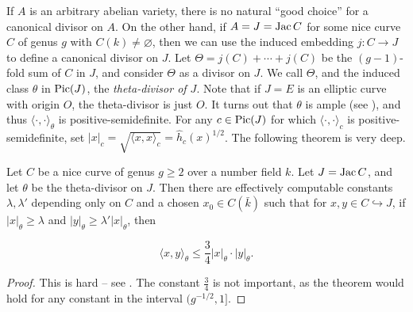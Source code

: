 If $A$ is an arbitrary abelian variety, there is no natural ``good choice'' for 
a canonical divisor on $A$. On the other hand, if $A=J=\operatorname{Jac} C$ for some nice 
curve $C$ of genus $g$ with $C(k)\ne\varnothing$, then we can use the induced 
embedding $j:C\to J$ to define a canonical divisor on $J$. Let 
$\Theta=j(C)+\cdots + j(C)$ be the $(g-1)$-fold sum of $C$ in $J$, and consider 
$\Theta$ as a divisor on $J$. We call $\Theta$, and the induced class $\theta$ 
in $\operatorname{Pic}(J)$, the \emph{theta-divisor of $J$}. Note that if $J=E$ is an elliptic 
curve with origin $O$, the theta-divisor is just $O$.  It turns out that 
$\theta$ is ample (see \cite[8.10.22]{bg06}), and thus 
$\langle\cdot,\cdot\rangle_\theta$ is positive-semidefinite. For any 
$c\in \operatorname{Pic}(J)$ for which $\langle\cdot,\cdot\rangle_c$ is 
positive-semidefinite, set 
$|x|_c=\sqrt{\langle x,x\rangle_c} = \widehat h_c(x)^{1/2}$. The following 
theorem is very deep.

\begin{theorem}
Let $C$ be a nice curve of genus $g\geqslant 2$ over a number field $k$. Let 
$J=\operatorname{Jac} C$, and let $\theta$ be the theta-divisor on $J$. Then there are 
effectively computable constants $\lambda,\lambda'$ depending only on $C$ and 
a chosen $x_0\in C(\bar k)$ such that for $x,y\in C\hookrightarrow J$, if 
$|x|_\theta\geqslant \lambda$ and 
$|y|_\theta\geqslant \lambda'|x|_\theta$, then 

\[
  \langle x,y\rangle_\theta \leqslant \frac 3 4 |x|_\theta\cdot |y|_\theta\text{.}
\]
\end{theorem}
\begin{proof}
This is hard -- see \cite[11.9.1]{bg06}. The constant $\frac 3 4$ is not 
important, as the theorem would hold for any constant in the interval 
$(g^{-1/2},1]$. 
\end{proof}













